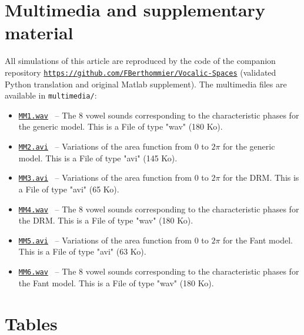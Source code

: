 \documentclass[10pt,twocolumn]{article}
\newcommand{\repobase}{https://github.com/FBerthommier/Vocalic-Spaces}
\newcommand{\repourl}{\href{\repobase}{\texttt{\repobase}}}
\newcommand{\docsection}[1]{\section*{#1}}
\newcommand{\multimedia}[2]{\item[]\href{\repobase/multimedia/#1}{\texttt{#1}}
 ~-- #2\par}
\begin{document}
\docsection{Multimedia and supplementary material}
All simulations of this article are reproduced by the code of the companion
repository \repourl{} (validated Python translation and original Matlab
supplement).  The multimedia files are available in \texttt{multimedia/}:
\begin{itemize}\small
\multimedia{MM1.wav}{The 8 vowel sounds \textipa{[1, u, o, O, a, E, e, i]} corresponding to the characteristic phases for the generic model. This is a File of type "wav" (180 Ko).}\label{vowelsgeneric}
\multimedia{MM2.avi}{Variations of the area function from $0$ to $2\pi$ for the generic model. This is a File of type "avi" (145 Ko).}\label{areageneric}
\multimedia{MM3.avi}{Variations of the area function from $0$ to $2\pi$ for the DRM. This is a File of type "avi" (65 Ko).}\label{areaDRM}
\multimedia{MM4.wav}{The 8 vowel sounds corresponding to the characteristic phases for the DRM. This is a File of type "wav" (180 Ko).}\label{vowelsDRM}
\multimedia{MM5.avi}{Variations of the area function from $0$ to $2\pi$ for the Fant model. This is a File of type "avi" (63 Ko).}\label{areaFant}
\multimedia{MM6.wav}{The 8 vowel sounds corresponding to the characteristic phases for the Fant model. This is a File of type "wav" (180 Ko).}\label{vowelsFant}
\end{itemize}




\onecolumn
\docsection{Tables}
\end{document}
